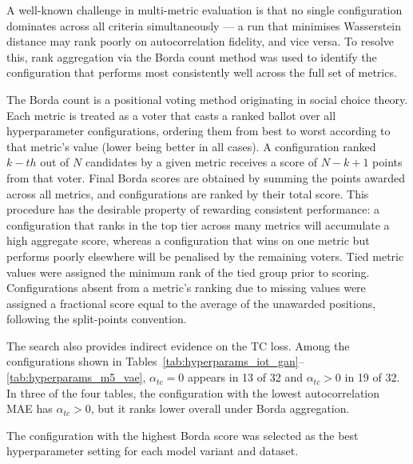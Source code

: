 \documentclass[make,article,submit,moreauthors]{Definitions/mdpi}
\begin{document}
A well-known challenge in multi-metric evaluation is that no single configuration dominates across all criteria simultaneously — a run that minimises Wasserstein distance may rank poorly on autocorrelation fidelity, and vice versa. To resolve this, rank aggregation via the Borda count method was used to identify the configuration that performs most consistently well across the full set of metrics.

The Borda count is a positional voting method originating in social choice theory. Each metric is treated as a voter that casts a ranked ballot over all hyperparameter configurations, ordering them from best to worst according to that metric's value (lower being better in all cases). A configuration ranked $k-th$ out of $N$ candidates by a given metric receives a score of $N-k+1$ points from that voter. Final Borda scores are obtained by summing the points awarded across all metrics, and configurations are ranked by their total score. This procedure has the desirable property of rewarding consistent performance: a configuration that ranks in the top tier across many metrics will accumulate a high aggregate score, whereas a configuration that wins on one metric but performs poorly elsewhere will be penalised by the remaining voters. Tied metric values were assigned the minimum rank of the tied group prior to scoring. Configurations absent from a metric's ranking due to missing values were assigned a fractional score equal to the average of the unawarded positions, following the split-points convention.

The search also provides indirect evidence on the TC loss. Among the configurations shown in Tables~\ref{tab:hyperparams_iot_gan}--\ref{tab:hyperparams_m5_vae}, $\alpha_{tc}=0$ appears in 13 of 32 and $\alpha_{tc}>0$ in 19 of 32. In three of the four tables, the configuration with the lowest autocorrelation MAE has $\alpha_{tc}>0$, but it ranks lower overall under Borda aggregation.

The configuration with the highest Borda score was selected as the best hyperparameter setting for each model variant and dataset.
\end{document}
